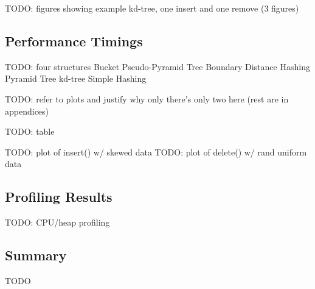 TODO: figures showing example kd-tree, one insert and one remove (3 figures)

\subsection{Performance Timings}

TODO: four structures
	Bucket Pseudo-Pyramid Tree
	Boundary Distance Hashing
	Pyramid Tree
	kd-tree
	Simple Hashing

TODO: refer to plots and justify why only there's only two here (rest are in appendices)

TODO: table

TODO: plot of insert() w/ skewed data
TODO: plot of delete() w/ rand uniform data

\subsection{Profiling Results}

TODO: CPU/heap profiling

\subsection{Summary}

TODO
